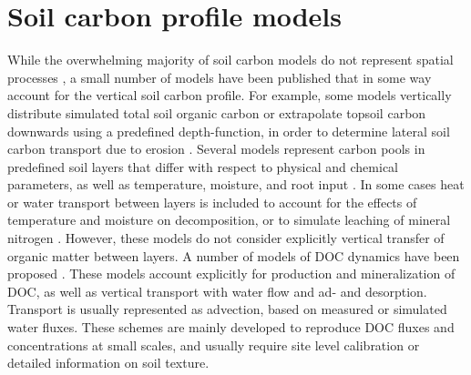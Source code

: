 \documentclass[11pt, oneside, a4paper]{article}   	%
\providecommand{\DIFaddbegin}{} %
\providecommand{\DIFaddend}{} %
\newcommand{\DIFaddincludegraphics}[2][]{{\color{blue}\fbox{\DIFOincludegraphics[#1]{#2}}}} %
\DeclareRobustCommand{\DIFaddbegin}{\DIFOaddbegin \let\includegraphics\DIFaddincludegraphics} %
\DeclareRobustCommand{\DIFaddend}{\DIFOaddend \let\includegraphics\DIFOincludegraphics} %
\begin{document}


\DIFaddend \section{Soil carbon profile models} \DIFaddbegin \label{sec:models}
\DIFaddend While the overwhelming majority of soil carbon models do not represent spatial processes \citep{Manzoni2009}, a small number of models have been published that in some way account for the
vertical soil carbon profile. For example, some models vertically distribute simulated total soil organic carbon or extrapolate topsoil carbon downwards using a predefined
depth-function, in order to determine lateral soil carbon transport due to erosion
\citep{Rosenbloom2001, Hilinski2001}. Several models represent carbon pools in
predefined soil layers that differ with respect to physical and chemical parameters,
as well as temperature, moisture, and root input \citep{vanVeen1981, Grant1993}. In some cases heat or water transport between layers is included to account for the effects of temperature and moisture on decomposition, or to simulate
leaching of mineral nitrogen \citep{Hansen1991, Li1992}. However, these
models do not consider explicitly vertical transfer of organic matter between layers.
A number of models of DOC dynamics have been
proposed \citep{Michalzik2003, Neff2001, Gjettermann2008, Brovelli2012}. These models account explicitly for production and mineralization of DOC, as well as vertical transport with water flow and ad- and desorption. Transport is usually represented as advection, based on measured or simulated
water fluxes. These schemes are mainly developed to reproduce DOC fluxes and
concentrations at small scales, and usually require site level calibration or detailed
information on soil texture.
\end{document}

